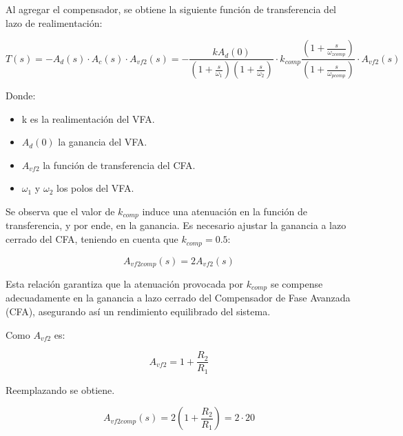 \documentclass[12pt,A4paper,titlepage]{article}
\begin{document}
\hspace{1mm} Al agregar el compensador, se obtiene la siguiente función de transferencia del lazo de realimentación:

\begin{equation}
    T(s) = -A_d(s) \cdot A_c(s) \cdot A_{vf2} (s) = - \frac{kA_d(0)}{\left(1+\frac{s}{\omega_1}\right)\left(1+\frac{s}{\omega_2}\right)} \cdot k_{comp} \frac{\left(1 + \frac{s}{\omega_{zcomp}}\right)}{\left(1+\frac{s}{\omega_{pcomp}}\right)} \cdot A_{vf2}(s)
\end{equation}

\hspace{1mm} Donde:

\begin{itemize}[itemsep=1pt]
    \item k es la realimentación del VFA.
    \item \(A_d(0)\) la ganancia del VFA.
    \item \(A_{vf2}\) la función de transferencia del CFA.
    \item \( \omega_1 \) y \( \omega_2 \) los polos del VFA.
\end{itemize}

\hspace{1mm} Se observa que el valor de \(k_{comp}\) induce una atenuación en la función de transferencia, y por ende, en la ganancia. Es necesario ajustar la ganancia a lazo cerrado del CFA, teniendo en cuenta que \( k_{comp} = 0.5 \):

\begin{equation}
    A_{vf2 comp} (s) = 2A_{vf2}(s)
\end{equation}

\hspace{1mm} Esta relación garantiza que la atenuación provocada por \(k_{comp}\) se compense adecuadamente en la ganancia a lazo cerrado del Compensador de Fase Avanzada (CFA), asegurando así un rendimiento equilibrado del sistema.

\hspace{1mm} Como \(A_{vf2}\) es:

\begin{equation}
    A_{vf2} = 1 + \frac{R_2}{R_1}
\end{equation}

\hspace{1mm} Reemplazando se obtiene.

\begin{equation}
    A_{vf2 comp} (s) = 2 \left( 1 + \frac{R_2}{R_1} \right) = 2 \cdot 20
\end{equation}
\end{document}
